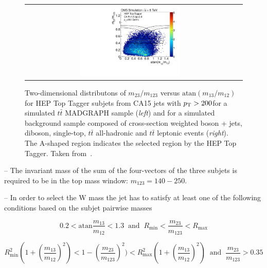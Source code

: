 \begin{description}
\begin{figure}[!tp]
\begin{tabular}{cc}
    \includegraphics[width=0.49\textwidth]{figures/Pheno2DPlot_HTT2D_NOheptoptag_NOmasscut_hists_Background_Add.pdf}
  \end{tabular}
  \caption{Two-dimensional distributons of $m_{\mathrm{23}}/m_{\mathrm{123}}$ versus $\mathrm{atan}(m_{\mathrm{13}}/m_{\mathrm{12}})$ for HEP Top Tagger subjets from CA15 jets with $p_{\text{T}} > 200$\gev for a simulated $t\bar{t}$ MADGRAPH sample (\textit{left}) and for a simulated background sample composed of cross-section weighted boson + jets, diboson, single-top, $t\bar{t}$ all-hadronic and $t\bar{t}$ leptonic events (\textit{right}). The A-shaped region indicates the selected region by the HEP Top Tagger. Taken from~\cite{CMS:2014fya}.}
  \label{fig:boosted_top_hep_variables}
\end{figure}
\begin{description}
 \item -- The invariant mass of the sum of the four-vectors of the three subjets is required to be in the top mass window: $m_{\mathrm{123}} = 140 - 250$\gev.
 \item -- In order to select the W mass the jet has to satisfy at least one of the following conditions based on the subjet pairwise masses
\begin{description}
 \item \begin{equation*}
0.2 < \mathrm{atan} \frac{m_{\mathrm{13}}}{m_{\mathrm{12}}} < 1.3 \; \; \mathrm{and} \; \; R_{\mathrm{min}} < \frac{m_{\mathrm{23}}}{m_{\mathrm{123}}} < R_{\mathrm{max}}
\end{equation*}
 \item \begin{equation*}
R^2_{\mathrm{min}}(1+(\frac{m_{\mathrm{13}}}{m_{\mathrm{12}}})^2) < 1 - (\frac{m_{\mathrm{23}}}{m_{\mathrm{123}}})^2) < R^2_{\mathrm{max}}(1+(\frac{m_{\mathrm{13}}}{m_{\mathrm{12}}})^2) \; \; \mathrm{and} \; \; \frac{m_{\mathrm{23}}}{m_{\mathrm{123}}} > 0.35
\end{equation*}
 \item \begin{equation*}

\end{equation*}
\end{description}
\end{description}
\end{description}
